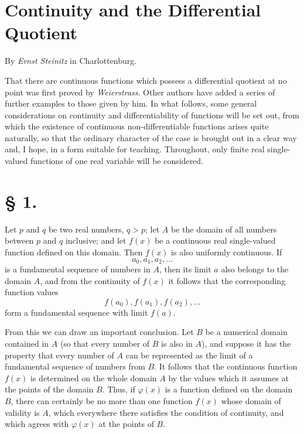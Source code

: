 \documentclass[11pt,a4paper]{article}
\begin{document}
\section*{Continuity and the Differential Quotient}
\begin{center}
By \emph{Ernst Steinitz} in Charlottenburg.
\end{center}

That there are continuous functions which possess a differential quotient at no point was first proved by \emph{Weierstrass}. Other authors have added a series of further examples to those given by him. In what follows, some general considerations on continuity and differentiability of functions will be set out, from which the existence of continuous non-differentiable functions arises quite naturally, so that the ordinary character of the case is brought out in a clear way and, I hope, in a form suitable for teaching. Throughout, only finite real single-valued functions of one real variable will be considered.

\section*{§ 1.}

Let $p$ and $q$ be two real numbers, $q>p$; let $A$ be the domain of all numbers between $p$ and $q$ inclusive; and let $f(x)$ be a continuous real single-valued function defined on this domain. Then $f(x)$ is also uniformly continuous. If
\[
 a_0,a_1,a_2,\ldots
\]
is a fundamental sequence of numbers in $A$, then its limit $a$ also belongs to the domain $A$, and from the continuity of $f(x)$ it follows that the corresponding function values
\[
 f(a_0),f(a_1),f(a_2),\ldots
\]
form a fundamental sequence with limit $f(a)$.

From this we can draw an important conclusion. Let $B$ be a numerical domain contained in $A$ (so that every number of $B$ is also in $A$), and suppose it has the property that every number of $A$ can be represented as the limit of a fundamental sequence of numbers from $B$. It follows that the continuous function $f(x)$ is determined on the whole domain $A$ by the values which it assumes at the points of the domain $B$. Thus, if $\varphi(x)$ is a function defined on the domain $B$, there can certainly be no more than one function $f(x)$ whose domain of validity is $A$, which everywhere there satisfies the condition of continuity, and which agrees with $\varphi(x)$ at the points of $B$.
\end{document}
